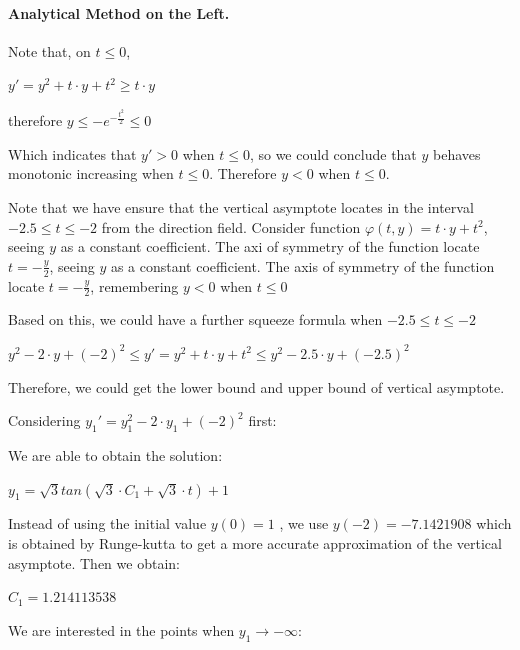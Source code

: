 \documentclass[11pt,a4paper]{article}
\begin{document}
	\paragraph{Analytical Method on the Left.} Note that, on $t \leq 0$,

	\begin{center}
		$y'=y^2+t \cdot y+t^2 \geq t \cdot y$

		therefore $y \leq -e^{-\frac{t^2}{2}} \leq 0$
	\end{center}
	Which indicates that $y' > 0$ when $t \leq 0$, so we could conclude that $y$ behaves monotonic increasing when $t \leq 0$. Therefore $y < 0$ when $t \leq 0$.

	Note that we have ensure that the vertical asymptote locates in the interval $-2.5 \leq t \leq -2$ from the direction field. Consider function $\varphi(t,y) = t \cdot y+t^2$, seeing $y$ as a constant coefficient. The axi of symmetry of the function locate $t=-\frac{y}{2}$, seeing $y$ as a constant coefficient. The axis of symmetry of the function locate $t= - \frac{y}{2}$, remembering $y<0$ when $t \leq 0$

	Based on this, we could have a further squeeze formula when $-2.5 \leq t \leq -2$

	\begin{center}
		$y^2-2 \cdot y+(-2)^2 \leq y' = y^2 + t \cdot y + t^2 \leq y^2 - 2.5 \cdot y + (-2.5)^2$
	\end{center}

	Therefore, we could get the lower bound and upper bound of vertical asymptote.

	Considering $y_1'=y_1^2-2 \cdot y_1+(-2)^2$ first:

	We are able to obtain the solution: 
	
	\begin{center}
		$y_1=\sqrt{3}tan({\sqrt{3} \cdot C_1+\sqrt{3} \cdot t})+1$
	\end{center}

	Instead of using the initial value $y(0)=1$ , we use $y(-2)=-7.1421908$ which is obtained by Runge-kutta to get a more accurate approximation of the vertical asymptote. Then we obtain: 
	
	\begin{center}
		$C_1=1.214113538$
	\end{center}

	We are interested in the points when $y_1 \rightarrow -\infty$:
\end{document}
